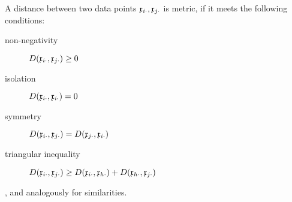 \begin{refsection}
A distance between two data points \(\mathfrak{x}_{i\cdot}, \mathfrak{x}_{j\cdot} \) is metric, if it meets the following conditions:
\begin{description}
  \item[non-negativity]{\( D(\mathfrak{x}_{i\cdot}, \mathfrak{x}_{j\cdot}) \geq 0 \)}
  \item[isolation]{\( D(\mathfrak{x}_{i\cdot}, \mathfrak{x}_{i\cdot}) = 0 \)}
  \item[symmetry]{\( D(\mathfrak{x}_{i\cdot}, \mathfrak{x}_{j\cdot}) = D(\mathfrak{x}_{j\cdot}, \mathfrak{x}_{i\cdot}) \)}
  \item[triangular inequality]{\( D(\mathfrak{x}_{i\cdot}, \mathfrak{x}_{j\cdot}) \geq D(\mathfrak{x}_{i\cdot}, \mathfrak{x}_{h\cdot}) + D(\mathfrak{x}_{h\cdot}, \mathfrak{x}_{j\cdot}) \) }
\end{description}
, and analogously for similarities.


\end{refsection}
